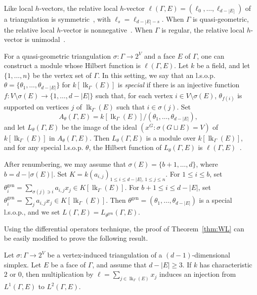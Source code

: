 Like local $h$-vectors, the relative local $h$-vector $\ell(\Gamma, E) = (\ell_0, \dotsc, \ell_{d - |E|})$ of a triangulation is symmetric~\cite[Remark 3.7]{AthanasiadisFlag}, with $\ell_s = \ell_{d - |E| - s}$. When $\Gamma$ is quasi-geometric, the relative local $h$-vector is nonnegative~\cite{Athanasiadis12b,LPS1}. When $\Gamma$ is regular, the relative local $h$-vector is unimodal~\cite{KatzStapledon16}.

For a quasi-geometric triangulation $\sigma \colon \Gamma \to 2^V$ and a face $E$ of $\Gamma$, one can construct a module whose Hilbert function is $\ell(\Gamma, E)$. Let $k$ be a field, and let $\{ 1, \ldots, n \}$ be the vertex set of $\Gamma$. In this setting, we say that an l.s.o.p. $\theta = \{\theta_1, \dotsc, \theta_{d - |E|}\}$ for $k[\operatorname{lk}_{\Gamma}(E)]$ is \emph{special} if there is an injective function $f \colon V \setminus \sigma(E) \to \{1, \dotsc, d - |E|\}$ such that, for each vertex $i \in V \setminus \sigma(E)$, $\theta_{f(i)}$ is supported on vertices $j$ of $\operatorname{lk}_{\Gamma}(E)$ 
such that $i \in \sigma(j)$. Set
$$A_{\theta}(\Gamma, E) = k[\operatorname{lk}_{\Gamma}(E)]/(\theta_1, \dotsc, \theta_{d - |E|}),$$
and let $L_{\theta}(\Gamma, E)$  be the image of the ideal $(x^G : \sigma(G \sqcup E) = V)$ of $k[\operatorname{lk}_{\Gamma}(E)]$ in $A_{\theta}(\Gamma, E)$. Then $L_{\theta}(\Gamma, E)$ is a module over $k[\operatorname{lk}_{\Gamma}(E)]$, and for any special l.s.o.p. $\theta$, the Hilbert function of $L_{\theta}(\Gamma, E)$ is $\ell(\Gamma, E)$~\cite{Athanasiadis12b,LPS1}. 


After renumbering, we may assume that $\sigma(E) = \{b+1, \dotsc, d\}$, where $b = d - |\sigma(E)|$. Set $K = k(a_{i,j})_{1 \le i \le d - |E|, \, 1 \le j \le n}$. For $1 \le i \le b$, set $\theta_i^{\operatorname{gen}} = \sum_{\sigma(j) \ni i} a_{i,j} x_j \in K[\operatorname{lk}_{\Gamma}(E)]$. For $b+1 \le i \le d - |E|$, set $\theta_i^{\operatorname{gen}} = \sum_{j} a_{i,j} x_j \in K[\operatorname{lk}_{\Gamma}(E)]$. Then $\theta^{\operatorname{gen}} = (\theta_1, \dotsc, \theta_{d - |E|})$ is a special l.s.o.p., and we set $L(\Gamma, E) = L_{\theta^{\operatorname{gen}}}(\Gamma, E)$. 

Using the differential operators technique, the proof of Theorem~\ref{thm:WL} can be easily modified to prove the following result. 

\begin{theo}
Let $\sigma \colon \Gamma \to 2^V$ be a vertex-induced triangulation of a $(d-1)$-dimensional simplex. Let $E$ be a face of $\Gamma$, and assume that $d - |E| \ge 3$. If $k$ has characteristic $2$ or $0$, then multiplication by $\ell = 
\sum_{j \in \operatorname{lk}_{\Gamma}(E)} x_j$ induces an injection from $L^1(\Gamma, E)$ to $L^2(\Gamma, E)$. 
\end{theo}


